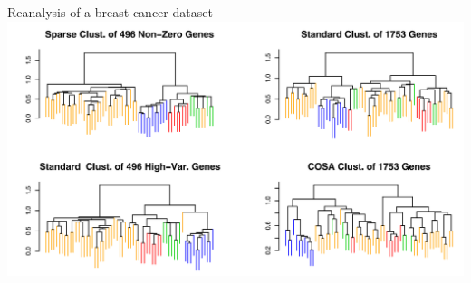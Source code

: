 \documentclass[12pt]{beamer}
\begin{document}
\begin{frame}{Reanalysis of a breast cancer dataset}
\includegraphics[scale=0.6]{fig7.png}
\end{frame}
\end{document}
